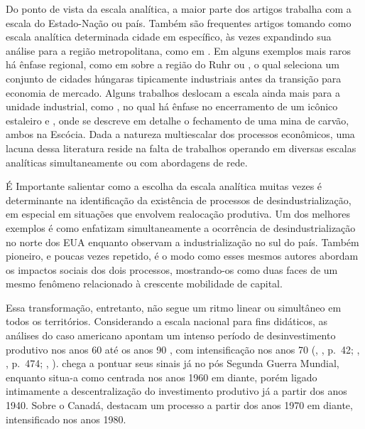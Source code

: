 Do ponto de vista da escala analítica, a maior parte dos artigos
trabalha com a escala do Estado-Nação ou país. Também são frequentes
artigos tomando como escala analítica determinada cidade em específico,
às vezes expandindo sua análise para a região metropolitana, como em
\citet{highsmith_beyond_2014}. Em alguns
exemplos mais raros há ênfase regional, como em \citet{berger_burdens_2017}
sobre a região do Ruhr ou \citet{scheiring_left_2020}, o qual
seleciona um conjunto de cidades húngaras tipicamente industriais antes
da transição para economia de mercado. Alguns trabalhos deslocam a
escala ainda mais para a unidade industrial, como \citet{hodson_titanic_2019}, no qual
há ênfase no encerramento de um icônico estaleiro e \citet{phillips_closure_2015}, onde se
descreve em detalhe o fechamento de uma mina de carvão, ambos na
Escócia. Dada a natureza multiescalar dos processos econômicos, uma
lacuna dessa literatura reside na falta de trabalhos operando em
diversas escalas analíticas simultaneamente ou com abordagens de rede.

É Importante salientar como a escolha da escala analítica muitas
vezes é determinante na identificação da existência de processos de
desindustrialização, em especial em situações que envolvem realocação
produtiva. Um dos melhores exemplos é como \citet{bluestone_deindustrialization_1982} enfatizam
simultaneamente a ocorrência de desindustrialização no norte dos EUA
enquanto observam a industrialização no sul do país. Também pioneiro, e
poucas vezes repetido, é o modo como esses mesmos autores abordam os
impactos sociais dos dois processos, mostrando-os como duas faces de um
mesmo fenômeno relacionado à crescente mobilidade de capital.

Essa transformação, entretanto, não segue um ritmo linear ou
simultâneo em todos os territórios. Considerando a escala nacional para
fins didáticos, as análises do caso americano apontam um intenso período
de desinvestimento produtivo nos anos 60 até os anos 90
\citep{bluestone_deindustrialization_1982}, com intensificação nos anos 70
(\citeauthor{highsmith_beyond_2014}, \citeyear{highsmith_beyond_2014}, p.~42; \citeauthor{strangleman_deindustrialisation_2017}, \citeyear{strangleman_deindustrialisation_2017}, p.~474; \citeauthor{winant_hard_2019}, \citeyear{winant_hard_2019}). \citet{kollmeyer_explaining_2009} chega a
pontuar seus sinais já no pós Segunda Guerra Mundial, enquanto \citet{highsmith_beyond_2014} situa-a como
centrada nos anos 1960 em diante, porém ligado intimamente a
descentralização do investimento produtivo já a partir dos anos 1940.
Sobre o Canadá, \citet{clark_voices_2020} destacam
um processo a partir dos anos 1970 em diante, intensificado nos anos
1980.

